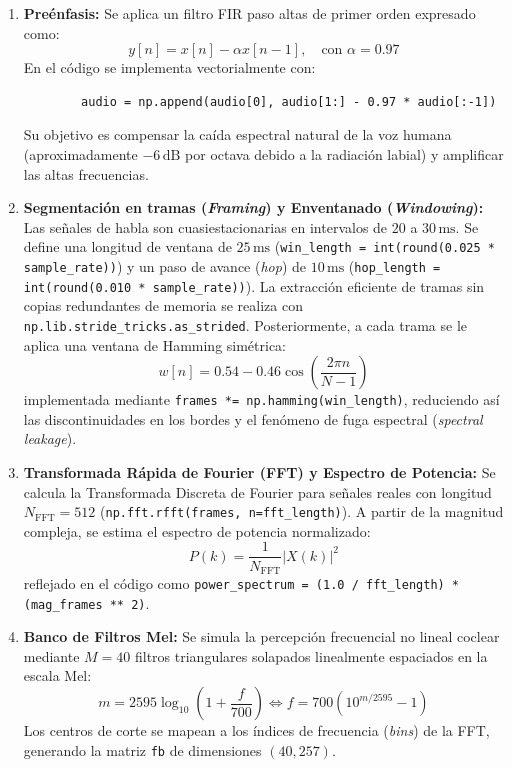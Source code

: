 \documentclass[12pt]{article}
\begin{document}
\begin{enumerate}
	\item \textbf{Preénfasis:} Se aplica un filtro FIR paso altas de primer orden expresado como:
	\begin{equation}
		y[n] = x[n] - \alpha x[n-1], \quad \text{con } \alpha = 0.97
	\end{equation}
	En el código se implementa vectorialmente con:
	\begin{verbatim}
		audio = np.append(audio[0], audio[1:] - 0.97 * audio[:-1])
	\end{verbatim}
	Su objetivo es compensar la caída espectral natural de la voz humana (aproximadamente $-6\,\text{dB}$ por octava debido a la radiación labial) y amplificar las altas frecuencias.
	
	\item \textbf{Segmentación en tramas (\textit{Framing}) y Enventanado (\textit{Windowing}):} Las señales de habla son cuasiestacionarias en intervalos de $20$ a $30\,\text{ms}$. Se define una longitud de ventana de $25\,\text{ms}$ (\texttt{win\_length = int(round(0.025 * sample\_rate))}) y un paso de avance (\textit{hop}) de $10\,\text{ms}$ (\texttt{hop\_length = int(round(0.010 * sample\_rate))}). La extracción eficiente de tramas sin copias redundantes de memoria se realiza con \texttt{np.lib.stride\_tricks.as\_strided}. Posteriormente, a cada trama se le aplica una ventana de Hamming simétrica:
	\begin{equation}
		w[n] = 0.54 - 0.46 \cos\left(\frac{2\pi n}{N-1}\right)
	\end{equation}
	implementada mediante \texttt{frames *= np.hamming(win\_length)}, reduciendo así las discontinuidades en los bordes y el fenómeno de fuga espectral (\textit{spectral leakage}).
	
	\item \textbf{Transformada Rápida de Fourier (FFT) y Espectro de Potencia:} Se calcula la Transformada Discreta de Fourier para señales reales con longitud $N_{\text{FFT}} = 512$ (\texttt{np.fft.rfft(frames, n=fft\_length)}). A partir de la magnitud compleja, se estima el espectro de potencia normalizado:
	\begin{equation}
		P(k) = \frac{1}{N_{\text{FFT}}} |X(k)|^2
	\end{equation}
	reflejado en el código como \texttt{power\_spectrum = (1.0 / fft\_length) * (mag\_frames ** 2)}.
	
	\item \textbf{Banco de Filtros Mel:} Se simula la percepción frecuencial no lineal coclear mediante $M = 40$ filtros triangulares solapados linealmente espaciados en la escala Mel:
	\begin{equation}
		m = 2595 \log_{10}\left(1 + \frac{f}{700}\right) \iff f = 700 \left(10^{m / 2595} - 1\right)
	\end{equation}
	Los centros de corte se mapean a los índices de frecuencia (\textit{bins}) de la FFT, generando la matriz \texttt{fb} de dimensiones $(40, 257)$.
	

\end{enumerate}
\end{document}

